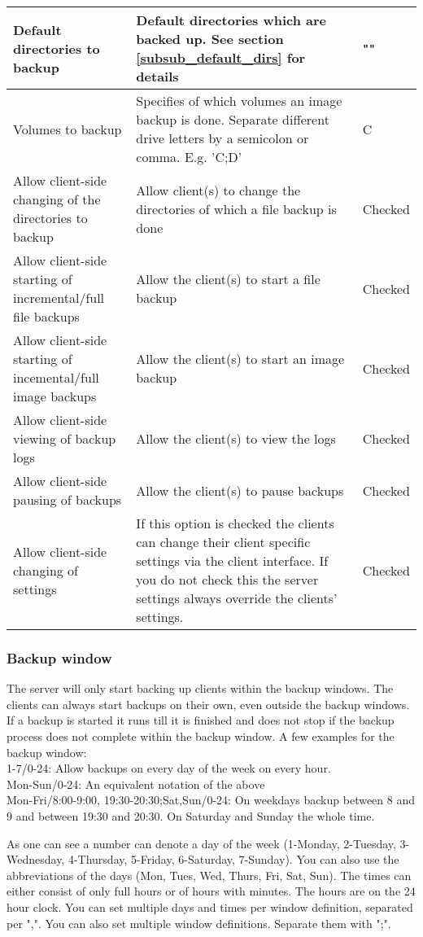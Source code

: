 \documentclass[a4paper,10pt]{article}
\begin{document}
\begin{longtable}{|p{}|p{}|p{}|}
\hline
Default directories to backup & Default directories which are backed up. See section \ref{subsub_default_dirs} for details & ""\\
\hline
Volumes to backup & Specifies of which volumes an image backup is done. Separate different drive letters by a semicolon or comma. E.g. 'C;D' & C \\
\hline
Allow client-side changing of the directories to backup & Allow client(s) to change the directories of which a file backup is done & Checked \\
\hline
Allow client-side starting of incremental/full file backups & Allow the client(s) to start a file backup & Checked \\
\hline
Allow client-side starting of incemental/full image backups & Allow the client(s) to start an image backup & Checked \\
\hline
Allow client-side viewing of backup logs & Allow the client(s) to view the logs & Checked \\
\hline
Allow client-side pausing of backups & Allow the client(s) to pause backups & Checked \\
\hline
Allow client-side changing of settings & If this option is checked the clients can change their client specific settings via the client interface. If you do not check this the server settings always override the clients' settings. & Checked\\
\hline
\end{longtable}

\subsubsection{Backup window}
\label{subsub_backup_window}

The server will only start backing up clients within the backup windows. The clients can always start backups on their own, even outside the backup windows. If a backup is started it runs till it is finished and does not stop if the backup process does not complete within the backup window. A few examples for the backup window:\\
1-7/0-24: Allow backups on every day of the week on every hour.\\
Mon-Sun/0-24: An equivalent notation of the above\\
Mon-Fri/8:00-9:00, 19:30-20:30;Sat,Sun/0-24: On weekdays backup between 8 and 9 and between 19:30 and 20:30. On Saturday and Sunday the whole time.

As one can see a number can denote a day of the week (1-Monday, 2-Tuesday, 3-Wednesday, 4-Thursday, 5-Friday, 6-Saturday, 7-Sunday). You can also use the abbreviations of the days (Mon, Tues, Wed, Thurs, Fri, Sat, Sun). The times can either consist of only full hours or of hours with minutes. The hours are on the 24 hour clock. You can set multiple days and times per window definition, separated per ",". You can also set multiple window definitions. Separate them with ";".
\end{document}
